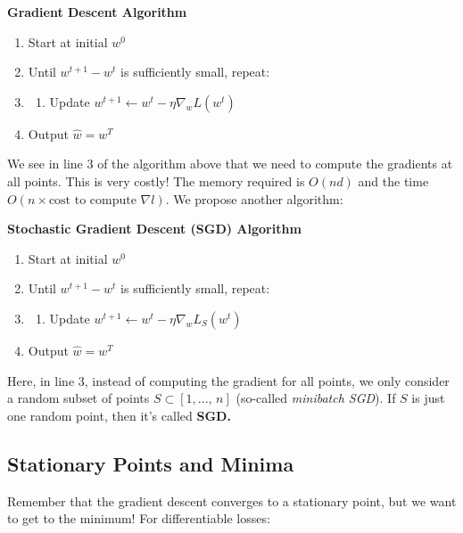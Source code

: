 \documentclass[a4paper]{extarticle}
\begin{document}
\begin{cbox}
    \textbf{Gradient Descent Algorithm}
    \begin{enumerate}
        \item Start at initial \(w^0\)
        \item Until \(w^{t + 1} - w^t\) is sufficiently small, repeat:
        \item \begin{enumerate}
        \item Update \(w^{t + 1} \leftarrow w^t - \eta \nabla_wL(w^t)\)
        \end{enumerate}
        \item Output \(\hat{w} = w^T\)
    \end{enumerate}
\end{cbox}

We see in line 3 of the algorithm above that we need to compute the gradients at all points. This is very costly! The memory required is \(O(nd)\) and the time \(O(n \times \text{cost to compute } \nabla l)\). We propose another algorithm:

\begin{cbox}
    \textbf{Stochastic Gradient Descent (SGD) Algorithm}
    \begin{enumerate}
        \item Start at initial \(w^0\)
        \item Until \(w^{t + 1} - w^t\) is sufficiently small, repeat:
        \item \begin{enumerate}
            \item Update \(w^{t + 1} \leftarrow w^t - \eta \nabla_w L_S(w^t)\)
        \end{enumerate}
        \item Output \(\hat{w} = w^T\)
    \end{enumerate}
\end{cbox}

Here, in line 3, instead of computing the gradient for all points, we only consider a random subset of points \(S \subset [1,..., \, n]\) (so-called \textit{minibatch SGD}). If \(S\) is just one random point, then it's called \textbf{SGD.}

\subsection{Stationary Points and Minima}

Remember that the gradient descent converges to a stationary point, but we want to get to the minimum! For differentiable losses:
\end{document}
